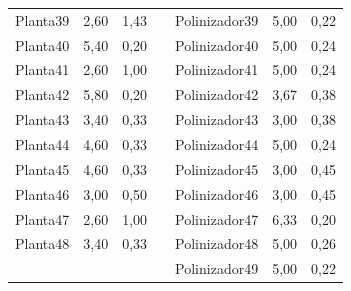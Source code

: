 \begin{table}[htbp]
\begin{tabular}{lrrrlrr}
    Planta39 & 2,60 & 1,43 &      & Polinizador39 & 5,00 & 0,22 \\
    Planta40 & 5,40 & 0,20 &      & Polinizador40 & 5,00 & 0,24 \\
    Planta41 & 2,60 & 1,00 &      & Polinizador41 & 5,00 & 0,24 \\
    Planta42 & 5,80 & 0,20 &      & Polinizador42 & 3,67 & 0,38 \\
    Planta43 & 3,40 & 0,33 &      & Polinizador43 & 3,00 & 0,38 \\
    Planta44 & 4,60 & 0,33 &      & Polinizador44 & 5,00 & 0,24 \\
    Planta45 & 4,60 & 0,33 &      & Polinizador45 & 3,00 & 0,45 \\
    Planta46 & 3,00 & 0,50 &      & Polinizador46 & 3,00 & 0,45 \\
    Planta47 & 2,60 & 1,00 &      & Polinizador47 & 6,33 & 0,20 \\
    Planta48 & 3,40 & 0,33 &      & Polinizador48 & 5,00 & 0,26 \\
         &      &      &      & Polinizador49 & 5,00 & 0,22 \\
    \bottomrule
    \end{tabular}%
\end{table}%